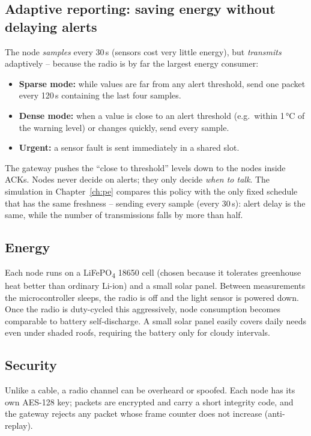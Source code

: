\documentclass[11pt,a4paper]{report}
\begin{document}
\subsection{Adaptive reporting: saving energy without delaying alerts}\label{sec:adaptive}
The node \emph{samples} every 30\,s (sensors cost very little energy), but \emph{transmits} adaptively -- because the radio is by far the largest energy consumer:
\begin{itemize}[noitemsep]
  \item \textbf{Sparse mode:} while values are far from any alert threshold, send one packet every 120\,s containing the last four samples.
  \item \textbf{Dense mode:} when a value is close to an alert threshold (e.g.\ within 1\,°C of the warning level) or changes quickly, send every sample.
  \item \textbf{Urgent:} a sensor fault is sent immediately in a shared slot.
\end{itemize}
The gateway pushes the ``close to threshold'' levels down to the nodes inside ACKs. Nodes never decide on alerts; they only decide \emph{when to talk}. The simulation in Chapter~\ref{ch:pe} compares this policy with the only fixed schedule that has the same freshness -- sending every sample (every 30\,s): alert delay is the same, while the number of transmissions falls by more than half.

\subsection{Energy}
Each node runs on a LiFePO\textsubscript{4} 18650 cell (chosen because it tolerates greenhouse heat better than ordinary Li-ion) and a small solar panel. Between measurements the microcontroller sleeps, the radio is off and the light sensor is powered down. Once the radio is duty-cycled this aggressively, node consumption becomes comparable to battery self-discharge. A small solar panel easily covers daily needs even under shaded roofs, requiring the battery only for cloudy intervals.

\subsection{Security}
Unlike a cable, a radio channel can be overheard or spoofed. Each node has its own AES-128 key; packets are encrypted and carry a short integrity code, and the gateway rejects any packet whose frame counter does not increase (anti-replay).
\end{document}
